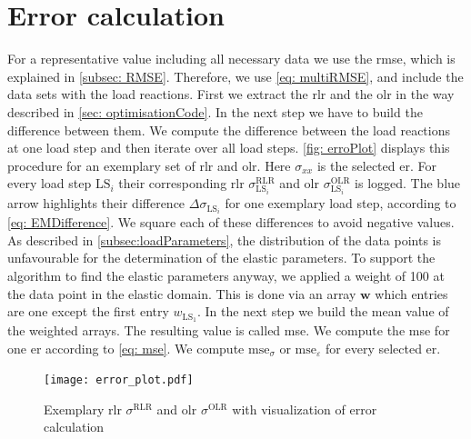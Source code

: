 \section{Error calculation}\label{sec: errorCalculation}
For a representative value including all necessary data we use the \acrshort{rmse}, which is explained in \autoref{subsec: RMSE}. Therefore, we use \autoref{eq: multiRMSE}, and include the data sets with the load reactions.
First we extract the \acrlong{rlr} and the \acrlong{olr} in the way described in \autoref{sec: optimisationCode}. In the next step we have to build the difference between them. We compute the difference between the load reactions at one load step and then iterate over all load steps. \autoref{fig: erroPlot} displays this procedure for an exemplary set of \acrlong{rlr} and \acrlong{olr}. Here $\sigma_{xx}$ is the selected \acrlong{er}. For every load step $\text{LS}_i$ their corresponding \acrfull{rlr} $\sigma_{\scriptscriptstyle\text{LS}_i}^{\scriptscriptstyle\text{RLR}}$ and \acrfull{olr} $\sigma_{\scriptscriptstyle\text{LS}_i}^{\scriptscriptstyle\text{OLR}}$ is logged. The blue arrow highlights their difference $\Delta\sigma_{\scriptscriptstyle\text{LS}_i}$ for one exemplary load step, according to \autoref{eq: EMDifference}. We square each of these differences to avoid negative values.  As described in \autoref{subsec:loadParameters}, the distribution of the data points is unfavourable for the determination of the elastic parameters. To support the algorithm to find the elastic parameters anyway, we applied a weight of 100 at the data point in the elastic domain. This is done via an array $\boldsymbol{w}$ which entries are one except the first entry $w_{\scriptscriptstyle\text{LS}_1}$. 
In the next step we build the mean value of the weighted arrays. The resulting value is called \acrfull{mse}. We compute the \acrshort{mse} for one \acrlong{er} according to \autoref{eq: mse}. We compute $\text{mse}_{\sigma}$ or $\text{mse}_{\varepsilon}$ for every selected \acrlong{er}. 

\begin{figure}[H]
    \centering
    \texttt{[image: error\_plot.pdf]}
    \caption{Exemplary \acrlong{rlr} $\sigma^{\scriptscriptstyle\text{RLR}}$ and \acrlong{olr} $\sigma^{\scriptscriptstyle\text{OLR}}$ with visualization of error calculation}
    \label{fig: erroPlot}
\end{figure}


